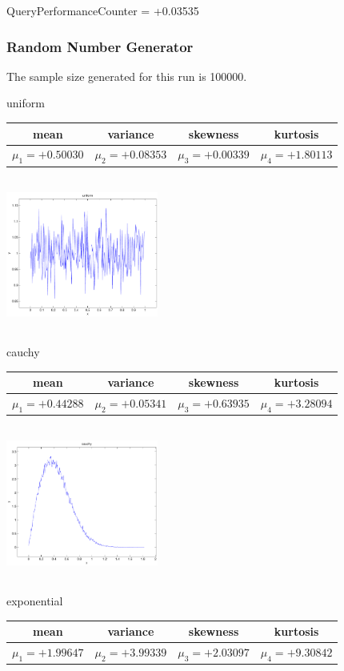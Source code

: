 \documentclass[9pt]{article}
\theoremstyle{plain}
\theoremstyle{definition}
\theoremstyle{remark}
\numberwithin{equation}{section}
\begin{document}
QueryPerformanceCounter  =  +0.03535
\subsubsection{Random Number Generator }
The sample size generated for this run is 100000.

\newpage
uniform \begin{tabular}{|c|c|c|c|}  mean & variance & skewness & kurtosis \\  \hline
$\mu_1 = +0.50030$ & $\mu_2 = +0.08353$ & $\mu_3 = +0.00339$ & $\mu_4 =+1.80113$ \\
\end{tabular}

\includegraphics[width=5cm,height=5cm]{uniform.pdf}

cauchy \begin{tabular}{|c|c|c|c|}  mean & variance & skewness & kurtosis \\  \hline
$\mu_1 = +0.44288$ & $\mu_2 = +0.05341$ & $\mu_3 = +0.63935$ & $\mu_4 =+3.28094$ \\
\end{tabular}

\includegraphics[width=5cm,height=5cm]{cauchy.pdf}

exponential \begin{tabular}{|c|c|c|c|}  mean & variance & skewness & kurtosis \\  \hline
$\mu_1 = +1.99647$ & $\mu_2 = +3.99339$ & $\mu_3 = +2.03097$ & $\mu_4 =+9.30842$ \\
\end{tabular}
\end{document}
